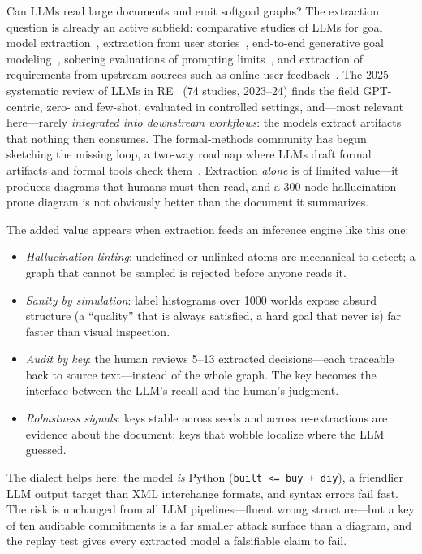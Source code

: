 \documentclass[sigconf,nonacm]{acmart}
\begin{document}
Can LLMs read large documents and emit softgoal graphs?
The extraction question is already an active subfield:
comparative studies of LLMs for goal model
extraction~\cite{chen24}, extraction from user
stories~\cite{gunes24}, end-to-end generative goal
modeling~\cite{gengoal25}, sobering evaluations of prompting
limits~\cite{llmgoal26}, and extraction of requirements from
upstream sources such as online user feedback~\cite{feedback25}.
The 2025 systematic review of LLMs in RE~\cite{llm4re25}
(74 studies, 2023--24) finds the field GPT-centric, zero- and
few-shot, evaluated in controlled settings, and---most relevant
here---rarely \emph{integrated into downstream workflows}: the
models extract artifacts that nothing then consumes. The
formal-methods community has begun sketching the missing loop,
a two-way roadmap where LLMs draft formal artifacts and formal
tools check them~\cite{roadmap25,formalsurvey25}. Extraction
\emph{alone} is of limited value---it produces diagrams that
humans must then read, and a 300-node hallucination-prone
diagram is not obviously better than the document it
summarizes.

The added value appears when extraction feeds an inference
engine like this one:

\begin{itemize}
\item \emph{Hallucination linting}: undefined or unlinked atoms
  are mechanical to detect; a graph that cannot be sampled is
  rejected before anyone reads it.
\item \emph{Sanity by simulation}: label histograms over 1000
  worlds expose absurd structure (a ``quality'' that is always
  satisfied, a hard goal that never is) far faster than visual
  inspection.
\item \emph{Audit by key}: the human reviews 5--13 extracted
  decisions---each traceable back to source text---instead of
  the whole graph. The key becomes the interface between the
  LLM's recall and the human's judgment.
\item \emph{Robustness signals}: keys stable across seeds and
  across re-extractions are evidence about the document; keys
  that wobble localize where the LLM guessed.
\end{itemize}

The dialect helps here: the model \emph{is} Python
(\verb|built <= buy + diy|), a friendlier LLM output target
than XML interchange formats, and syntax errors fail fast.
The risk is unchanged from all LLM pipelines---fluent wrong
structure---but a key of ten auditable commitments is a far
smaller attack surface than a diagram, and the replay test
gives every extracted model a falsifiable claim to fail.
\end{document}
